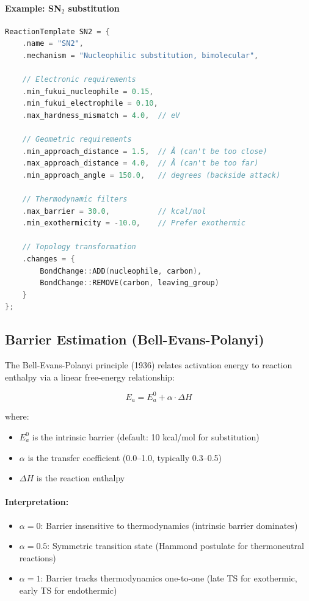 \documentclass[11pt]{article}
\begin{document}
\paragraph{Example: SN$_2$ substitution}
\begin{lstlisting}[language=C++]
ReactionTemplate SN2 = {
    .name = "SN2",
    .mechanism = "Nucleophilic substitution, bimolecular",
    
    // Electronic requirements
    .min_fukui_nucleophile = 0.15,
    .min_fukui_electrophile = 0.10,
    .max_hardness_mismatch = 4.0,  // eV
    
    // Geometric requirements
    .min_approach_distance = 1.5,  // Å (can't be too close)
    .max_approach_distance = 4.0,  // Å (can't be too far)
    .min_approach_angle = 150.0,   // degrees (backside attack)
    
    // Thermodynamic filters
    .max_barrier = 30.0,           // kcal/mol
    .min_exothermicity = -10.0,    // Prefer exothermic
    
    // Topology transformation
    .changes = {
        BondChange::ADD(nucleophile, carbon),
        BondChange::REMOVE(carbon, leaving_group)
    }
};
\end{lstlisting}

\subsection{Barrier Estimation (Bell-Evans-Polanyi)}

The Bell-Evans-Polanyi principle (1936) relates activation energy to reaction enthalpy via a linear free-energy relationship:

\begin{equation}
E_a = E_a^0 + \alpha \cdot \Delta H
\end{equation}

where:
\begin{itemize}
\item $E_a^0$ is the intrinsic barrier (default: 10 kcal/mol for substitution)
\item $\alpha$ is the transfer coefficient (0.0--1.0, typically 0.3--0.5)
\item $\Delta H$ is the reaction enthalpy
\end{itemize}

\paragraph{Interpretation:}
\begin{itemize}
\item $\alpha = 0$: Barrier insensitive to thermodynamics (intrinsic barrier dominates)
\item $\alpha = 0.5$: Symmetric transition state (Hammond postulate for thermoneutral reactions)
\item $\alpha = 1$: Barrier tracks thermodynamics one-to-one (late TS for exothermic, early TS for endothermic)
\end{itemize}
\end{document}
